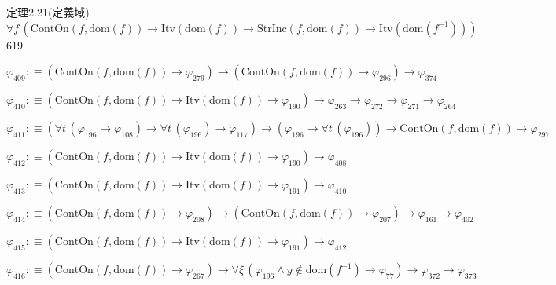 \begin{fullproof}{定理2.21(定義域)}{$\forall f\,(\mathrm{ContOn}(f,\mathrm{dom}(f)) \to \mathrm{Itv}(\mathrm{dom}(f)) \to \mathrm{StrInc}(f,\mathrm{dom}(f)) \to \mathrm{Itv}(\mathrm{dom}(f^{-1})))$}{619}
\begin{abbrevlist}
\item $\varphi_{409} :\equiv (\mathrm{ContOn}(f,\mathrm{dom}(f)) \to \varphi_{279}) \to (\mathrm{ContOn}(f,\mathrm{dom}(f)) \to \varphi_{296}) \to \varphi_{374}$
\item $\varphi_{410} :\equiv (\mathrm{ContOn}(f,\mathrm{dom}(f)) \to \mathrm{Itv}(\mathrm{dom}(f)) \to \varphi_{190}) \to \varphi_{263} \to \varphi_{272} \to \varphi_{271} \to \varphi_{264}$
\item $\varphi_{411} :\equiv (\forall t\,(\varphi_{196} \to \varphi_{108}) \to \forall t\,(\varphi_{196}) \to \varphi_{117}) \to (\varphi_{196} \to \forall t\,(\varphi_{196})) \to \mathrm{ContOn}(f,\mathrm{dom}(f)) \to \varphi_{297}$
\item $\varphi_{412} :\equiv (\mathrm{ContOn}(f,\mathrm{dom}(f)) \to \mathrm{Itv}(\mathrm{dom}(f)) \to \varphi_{190}) \to \varphi_{408}$
\item $\varphi_{413} :\equiv (\mathrm{ContOn}(f,\mathrm{dom}(f)) \to \mathrm{Itv}(\mathrm{dom}(f)) \to \varphi_{191}) \to \varphi_{410}$
\item $\varphi_{414} :\equiv (\mathrm{ContOn}(f,\mathrm{dom}(f)) \to \varphi_{208}) \to (\mathrm{ContOn}(f,\mathrm{dom}(f)) \to \varphi_{207}) \to \varphi_{161} \to \varphi_{402}$
\item $\varphi_{415} :\equiv (\mathrm{ContOn}(f,\mathrm{dom}(f)) \to \mathrm{Itv}(\mathrm{dom}(f)) \to \varphi_{191}) \to \varphi_{412}$
\item $\varphi_{416} :\equiv (\mathrm{ContOn}(f,\mathrm{dom}(f)) \to \varphi_{267}) \to \forall \xi\,(\varphi_{196} \land y \notin \mathrm{dom}(f^{-1}) \to \varphi_{77}) \to \varphi_{372} \to \varphi_{373}$
\end{abbrevlist}
\end{fullproof}
